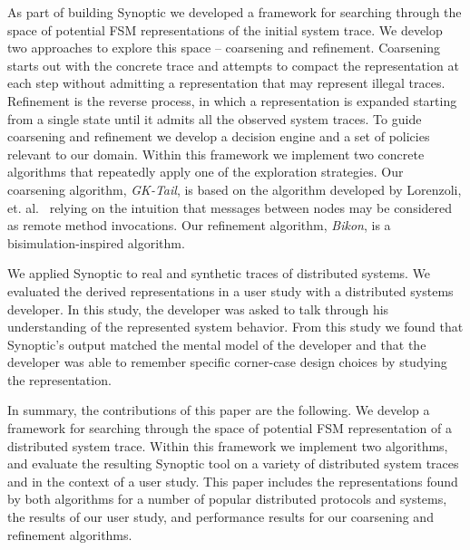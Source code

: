 
As part of building Synoptic we developed a framework for searching
through the space of potential FSM representations of the initial
system trace. We develop two approaches to explore this space --
coarsening and refinement. Coarsening starts out with the concrete
trace and attempts to compact the representation at each step without
admitting a representation that may represent illegal
traces. Refinement is the reverse process, in which a representation
is expanded starting from a single state until it admits all the
observed system traces. To guide coarsening and refinement we develop
a decision engine and a set of policies relevant to our domain. Within
this framework we implement two concrete algorithms that repeatedly
apply one of the exploration strategies. Our coarsening algorithm,
\emph{GK-Tail}, is based on the algorithm developed by Lorenzoli,
et. al.~\cite{AGSBM} relying on the intuition that messages between
nodes may be considered as remote method invocations. Our refinement
algorithm, \emph{Bikon}, is a bisimulation-inspired algorithm.


We applied Synoptic to real and synthetic traces of distributed
systems. We evaluated the derived representations in a user study with
a distributed systems developer. In this study, the developer was
asked to talk through his understanding of the represented system
behavior. From this study we found that Synoptic's output matched the
mental model of the developer and that the developer was able to
remember specific corner-case design choices by studying the
representation.

In summary, the contributions of this paper are the following. We
develop a framework for searching through the space of potential FSM
representation of a distributed system trace. Within this framework we
implement two algorithms, and evaluate the resulting Synoptic tool on
a variety of distributed system traces and in the context of a user
study. This paper includes the representations found by both
algorithms for a number of popular distributed protocols and systems,
the results of our user study, and performance results for our
coarsening and refinement algorithms.

